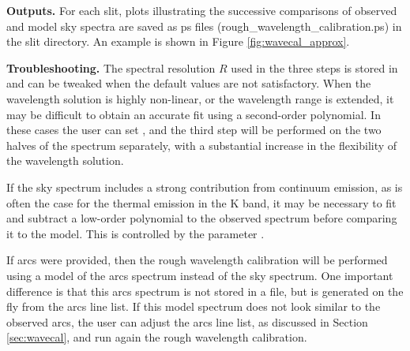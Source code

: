 \documentclass[a4paper]{article}
\begin{document}
\begin{sloppypar}
\medskip
\noindent
\textbf{Outputs.} For each slit, plots illustrating the successive comparisons of observed and model sky spectra are saved as ps files (rough\_wavelength\_calibration.ps) in the slit directory. An example is shown in Figure \ref{fig:wavecal_approx}.

\medskip
\noindent
\textbf{Troubleshooting.} The spectral resolution $R$ used in the three steps is stored in  and can be tweaked when the default values are not satisfactory. When the wavelength solution is highly non-linear, or the wavelength range is extended, it may be difficult to obtain an accurate fit using a second-order polynomial. In these cases the user can set , and the third step will be performed on the two halves of the spectrum separately, with a substantial increase in the flexibility of the wavelength solution.

If the sky spectrum includes a strong contribution from continuum emission, as is often the case for the thermal emission in the K band, it may be necessary to fit and subtract a low-order polynomial to the observed spectrum before comparing it to the model. This is controlled by the parameter .

If arcs were provided, then the rough wavelength calibration will be performed using a model of the arcs spectrum instead of the sky spectrum. One important difference is that this arcs spectrum is not stored in a file, but is generated on the fly from the arcs line list. If this model spectrum does not look similar to the observed arcs, the user can adjust the arcs line list, as discussed in Section \ref{sec:wavecal}, and run again the rough wavelength calibration.



\end{sloppypar}
\end{document}
